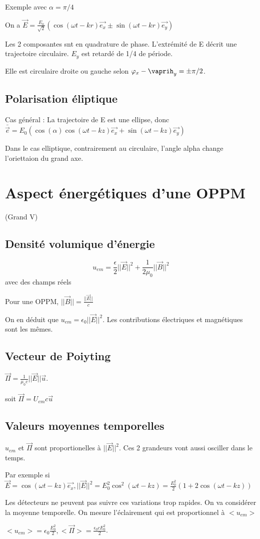 \documentclass[french]{yLectureNote}
\renewcommand{\vec}{\overrightarrow}
\newcommand{\norm}[1]{||\vec{#1}||}
\begin{document}
Exemple avec $\alpha=\pi/4$

On a $\vec{E} = \frac{E_0}{\sqrt{2}}(\cos(\omega t-kr)\vec{e_x}\pm \sin(\omega t-kr)\vec{e_y})$

Les 2 composantes snt en quadrature de phase. L'extrémité de E décrit une trajectoire circulaire. $E_y$ est retardé de 1/4 de période.

Elle est circulaire droite ou gauche selon $\varphi_x-\vaprih_y = \pm \pi/2$.

\subsection{Polarisation éliptique}
Cas général : La trajectoire de E est une ellipse, donc $\bar{\vec{e}} = E_0(\cos(\alpha)\cos(\omega t -kz)\vec{e_x}+\sin(\omega t -kz)\vec{e_y})$

Dans le cas elliptique, contrairement au circulaire, l'angle alpha change l'oriettaion du grand axe.

\section{Aspect énergétiques d'une OPPM} (Grand V)
\subsection{Densité volumique d'énergie}
$$u_{em} = \frac{\epsilon}{2}\norm{E}^2 + \frac{1}{2\mu_0}\norm{B}^2$$ avec des champs réels

Pour une OPPM, $\norm{B} = \frac{\norm{E}}{c}$

On en déduit que $u_{em} = \epsilon_0 \norm{E}^2$. Les contributions électriques et magnétiques sont les m\^emes.

\subsection{Vecteur de Poiyting}
$\vec{\Pi} = \frac{1}{\mu_0c}\norm{E}\vec{u}$.

soit $\vec{\Pi} = U_{em}c \vec{u}$

\subsection{Valeurs moyennes temporelles}
$u_{em}$ et $\vec{\Pi}$ sont proportionelles à $\norm{E}^2$. Ces 2 grandeurs vont aussi osciller dans le temps.

Par exemple si $\vec{E} = \cos(\omega t -kz)\vec{e_x}, \norm{E}^2 = E_0^2 \cos^2(\omega t -kz) = \frac{E_0^2}{2}(1+2\cos(\omega t -kz))$

Les détecteurs ne peuvent pas suivre ces variations trop rapides. On va considérer la moyenne temporelle. On mesure l'éclairement qui est proportionnel à $<u_{em}>$

$<u_{em}> = \epsilon_0 \frac{E_0^2}{2}, <\vec{\Pi}> = \frac{\epsilon_0 c E_0^2}{2}$.
\end{document}
